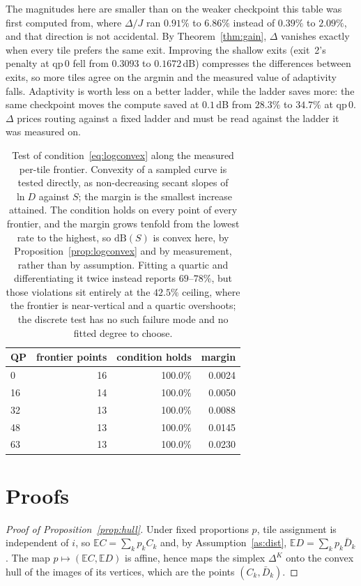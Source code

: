 \documentclass[10pt]{article}
\theoremstyle{plain}
\theoremstyle{definition}
\newcommand{\Ex}{\mathbb{E}}
\begin{document}
The magnitudes here are smaller than on the weaker checkpoint this table was
first computed from, where $\Delta/J$ ran $0.91\%$ to $6.86\%$ instead of
$0.39\%$ to $2.09\%$, and that direction is not accidental. By
Theorem~\ref{thm:gain}, $\Delta$ vanishes exactly when every tile prefers the
same exit. Improving the shallow exits (exit~2's penalty at $\mathrm{qp}\,0$
fell from $0.3093$ to $0.1672$\,dB) compresses the differences between exits,
so more tiles agree on the argmin and the measured value of adaptivity falls.
Adaptivity is worth less on a better ladder, while the ladder saves more: the
same checkpoint moves the compute saved at $0.1$\,dB from $28.3\%$ to $34.7\%$
at $\mathrm{qp}\,0$. $\Delta$ prices routing against a fixed ladder and must be
read against the ladder it was measured on.


\begin{table}[h]\centering\small
\caption{Test of condition~\eqref{eq:logconvex} along the measured per-tile
frontier. Convexity of a sampled curve is tested
directly, as non-decreasing secant slopes of $\ln D$ against $S$; the margin is
the smallest increase attained. The condition holds on every point of every
frontier, and the margin grows tenfold from the lowest rate to the highest, so
$\mathrm{dB}(S)$ is convex here, by Proposition~\ref{prop:logconvex} and by
measurement, rather than by assumption. Fitting a quartic and differentiating
it twice instead reports $69$--$78\%$, but those violations sit entirely at the
$42.5\%$ ceiling, where the frontier is near-vertical and a quartic overshoots;
the discrete test has no such failure mode and no fitted degree to choose.}
\label{tab:logconvex}
\begin{tabular}{lrrr}
\toprule
QP & frontier points & condition holds & margin \\
\midrule
0  & 16 & 100.0\% & 0.0024 \\
16 & 14 & 100.0\% & 0.0050 \\
32 & 13 & 100.0\% & 0.0088 \\
48 & 13 & 100.0\% & 0.0145 \\
63 & 13 & 100.0\% & 0.0230 \\
\bottomrule
\end{tabular}
\end{table}

\section{Proofs}

\begin{proof}[Proof of Proposition~\ref{prop:hull}]
Under fixed proportions $p$, tile assignment is independent of $i$, so
$\Ex C=\sum_k p_kC_k$ and, by Assumption~\ref{as:dist},
$\Ex D=\sum_k p_k\bar D_k$. The map $p\mapsto(\Ex C,\Ex D)$ is affine, hence
maps the simplex $\Delta^K$ onto the convex hull of the images of its vertices,
which are the points $(C_k,\bar D_k)$.
\end{proof}
\end{document}
